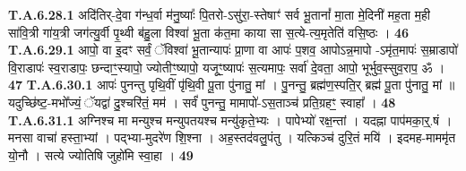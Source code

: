 \documentclass[17pt]{extarticle}
\begin{document}
                  \newline
                                                         \textbf{} \newline \newline
                                \textbf{ T.A.6.28.1} \newline
                  अदि॑तिर्-दे॒वा ग॑न्ध॒र्वा म॑नु॒ष्याः᳚ पि॒तरो-ऽसु॑रा॒-स्तेषाꣳ॑ सर्व भू॒तानां᳚ मा॒ता मे॒दिनी॑ मह॒ता म॒ही सा॑वि॒त्री गा॑य॒त्री जग॑त्यु॒र्वी पृ॒थ्वी ब॑हु॒ला विश्वा॑ भू॒ता क॑त॒मा काया सा स॒त्ये-त्य॒मृतेति॑ वसि॒ष्ठः । \textbf{ 46} \newline
                  \newline
                                                         \textbf{} \newline \newline
                                \textbf{ T.A.6.29.1} \newline
                  आपो॒ वा इ॒दꣳ सर्वं॒ ॅविश्वा॑ भू॒तान्यापः॑ प्रा॒णा वा आपः॑ प॒शव॒ आपोऽन्न॒मापो -ऽमृ॑त॒मापः॑ स॒म्राडापो॑ वि॒राडापः॑ स्व॒राडापः॒ छन्दाꣳ॒॒स्यापो॒ ज्योतीꣳ॒॒ष्यापो॒ यजूꣳ॒॒ष्यापः॑ स॒त्यमापः॒ सर्वा॑ दे॒वता॒ आपो॒ भूर्भुव॒स्सुव॒राप॒ ॐ । \textbf{ 47} \newline
                  \newline
                                                         \textbf{} \newline \newline
                                \textbf{ T.A.6.30.1} \newline
                  आपः॑ पुनन्तु पृथि॒वीं पृ॑थि॒वी पू॒ता पु॑नातु॒ मां ।  पु॒नन्तु॒ ब्रह्म॑ण॒स्पति॒र् ब्रह्म॑ पू॒ता पु॑नातु॒  मां ॥   यदुच्छि॑ष्ट॒-मभो᳚ज्यं॒ ॅयद्वा॑ दु॒श्चरि॑तं॒ मम॑ । सर्वं॑ पुनन्तु॒ मामापो॑-ऽस॒ताञ्च॑ प्रति॒ग्रहꣳ॒॒ स्वाहा᳚ । \textbf{ 48} \newline
                  \newline
                                                         \textbf{} \newline \newline
                                \textbf{ T.A.6.31.1} \newline
                  अग्निश्च मा मन्युश्च मन्युपतयश्च मन्यु॑कृते॒भ्यः ।  पापेभ्यो॑ रक्ष॒न्तां । यदह्ना पाप॑मका॒र्॒.षं ।  मनसा वाचा॑ हस्ता॒भ्यां । पद्भ्या-मुदरे॑ण शि॒श्ना ।  अह॒स्तद॑वलु॒पंतु । यत्किञ्च॑ दुरि॒तं मयि॑ ।  इदमह-माममृ॑त यो॒नौ ।  सत्ये ज्योतिषि जुहो॑मि स्वा॒हा । \textbf{ 49} \newline
                  \newline
\end{document}
